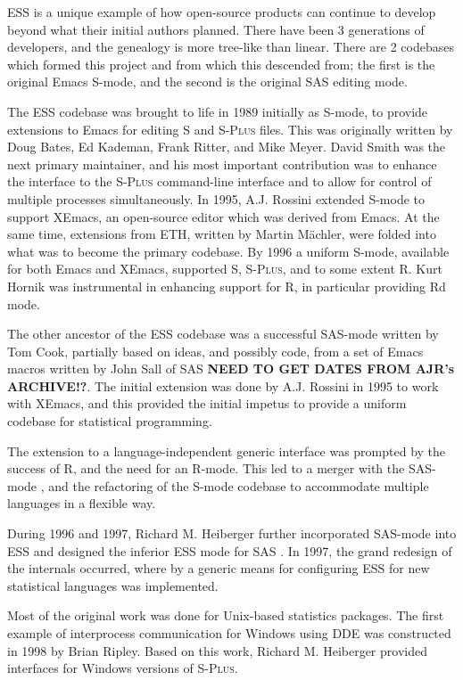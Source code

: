 \documentclass{article}
\newcommand*{\SAS}{\textsc{SAS}{\textregistered} }
\newcommand*{\Splus}{\textsc{S-Plus}}
\begin{document}
ESS is a unique example of how open-source products can continue to
develop beyond what their initial authors planned.  There have been 3
generations of developers, and the genealogy is more tree-like than
linear.  There are 2 codebases which formed this project and from
which this descended from; the first is the original Emacs S-mode, and
the second is the original \SAS editing mode.


The ESS codebase was brought to life in 1989 initially as S-mode, to
provide extensions to Emacs for editing S and \Splus{} files.  This
was originally written by Doug Bates, Ed Kademan, Frank Ritter, and
Mike Meyer.  David Smith was the next primary maintainer, and his most
important contribution was to enhance the interface to the \Splus{}
command-line interface and to allow for control of multiple processes
simultaneously.  In 1995, A.J.  Rossini extended S-mode to support
XEmacs, an open-source editor which was derived from Emacs.  At the
same time, extensions from ETH, written by Martin M{\"a}chler, were folded
into what was to become the primary codebase.  By 1996 a uniform
S-mode, available for both Emacs and XEmacs, supported S, \Splus, and
to some extent R.  Kurt Hornik was instrumental in enhancing support
for R, in particular providing Rd mode.

The other ancestor of the ESS codebase was a successful SAS-mode
written by Tom Cook, partially based on ideas, and possibly code, from
a set of Emacs macros written by John Sall of \SAS \textbf{NEED TO GET
  DATES FROM AJR's ARCHIVE!?}.  The initial extension was done by A.J.
Rossini in 1995 to work with XEmacs, and this provided the initial
impetus to provide a uniform codebase for statistical programming.

The extension to a language-independent generic interface was prompted
by the success of R, and the need for an R-mode.  This led to a merger
with the SAS-mode \citep{SASMODE}, and the refactoring of the S-mode
codebase to accommodate multiple languages in a flexible way.

During 1996 and 1997, Richard M. Heiberger further incorporated
SAS-mode into ESS and designed the inferior ESS mode for \SAS.  In
1997, the grand redesign of the internals occurred, where by a generic
means for configuring ESS for new statistical languages was
implemented.

Most of the original work was done for Unix-based statistics packages.
The first example of interprocess communication for Windows using DDE
was constructed in 1998 by Brian Ripley.  Based on this work, Richard
M. Heiberger provided interfaces for Windows versions of \Splus.
\end{document}
